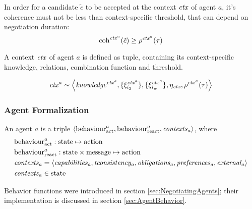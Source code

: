 \noindent
In order for a candidate $\tilde c$ to be accepted at the context $\mathit{ctx}$
of agent $a$, it's coherence must not be less than context-specific threshold,
that can depend on negotiation duration:
$$ \mathrm{coh}^{\mathit{ctx}^a}(\tilde c) \geq \rho^{\mathit{ctx}^a}(\tau) $$

\bigskip

\noindent
A context $\mathit{ctx}$ of agent $a$ is defined as tuple, containing its
context-specific knowledge, relations, combination function and threshold.

$$ \mathit{ctx}^a \sim \left< \mathit{knowledge^{\mathit{ctx}^a}},
                      \{\xi_{i_2}^{\mathit{ctx}^a}\},
                      \{\xi_{i_w}^{\mathit{ctx}^a}\},
                      \eta_{\mathit{ctx}},
                      \rho^{\mathit{ctx}^a}(\tau)
               \right> $$





\subsubsection{Agent Formalization}

\noindent
An agent $a$ is a triple $\left< \mathrm{behaviour}_{\mathrm{act}}^a,
                                 \mathrm{behaviour}_{\mathrm{react}}^a,
                                 \mathit{contexts}_a
                          \right>$, where
\begin{align*}
  &\mathrm{behaviour}_{\mathrm{act}}^a   : \mathrm{state} \mapsto \mathrm{action} \\
  &\mathrm{behaviour}_{\mathrm{react}}^a : \mathrm{state} \times \mathrm{message} \mapsto \mathrm{action} \\
  &\mathit{contexts}_a = \left< \mathit{capabilities_a},
                                \mathit{tconsistency_a},
                                \mathit{obligations_a},
                                \mathit{preferences_a},
                                \mathit{external_a}
                           \right>\\
  &\mathit{contexts}_a \in \mathrm{state}
\end{align*}

Behavior functions were introduced in section \ref{sec:NegotiatingAgents};
their implementation is discussed in section \ref{sec:AgentBehavior}.





